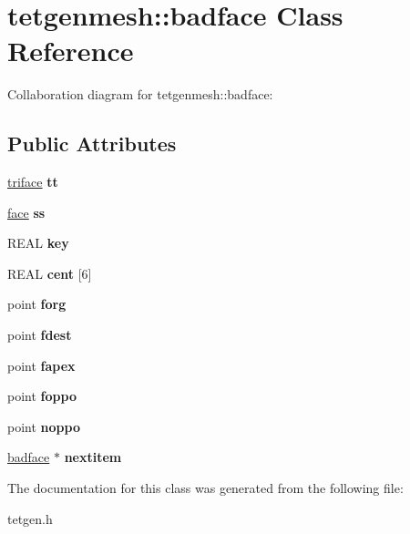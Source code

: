 \hypertarget{classtetgenmesh_1_1badface}{}\section{tetgenmesh\+:\+:badface Class Reference}
\label{classtetgenmesh_1_1badface}


Collaboration diagram for tetgenmesh\+:\+:badface\+:
\subsection*{Public Attributes}
\begin{DoxyCompactItemize}
\item 
\mbox{\label{classtetgenmesh_1_1badface_a01d24569e6058b3dae1a31e0638b849c}} 
\hyperlink{classtetgenmesh_1_1triface}{triface} {\bfseries tt}
\item 
\mbox{\label{classtetgenmesh_1_1badface_ace098878b5e89ec387c959d8acd0153d}} 
\hyperlink{classtetgenmesh_1_1face}{face} {\bfseries ss}
\item 
\mbox{\label{classtetgenmesh_1_1badface_ac94189eb4b728abd589597c89db9a1d7}} 
R\+E\+AL {\bfseries key}
\item 
\mbox{\label{classtetgenmesh_1_1badface_a72958cf685f881af15213f0925ccf72a}} 
R\+E\+AL {\bfseries cent} \mbox{[}6\mbox{]}
\item 
\mbox{\label{classtetgenmesh_1_1badface_a620b94f643bafaa7a4dbfeba7063a445}} 
point {\bfseries forg}
\item 
\mbox{\label{classtetgenmesh_1_1badface_a8e010478b28c997ad9b441d05df47695}} 
point {\bfseries fdest}
\item 
\mbox{\label{classtetgenmesh_1_1badface_a617348221ce387b323575110a5c79627}} 
point {\bfseries fapex}
\item 
\mbox{\label{classtetgenmesh_1_1badface_a8e9966e480c210ac83ab0a4c221a7000}} 
point {\bfseries foppo}
\item 
\mbox{\label{classtetgenmesh_1_1badface_ada4ec358fcf9261b2f14cff307e66fdf}} 
point {\bfseries noppo}
\item 
\mbox{\label{classtetgenmesh_1_1badface_ae87a801b03dbaa3dd5709ffed5eef5bc}} 
\hyperlink{classtetgenmesh_1_1badface}{badface} $\ast$ {\bfseries nextitem}
\end{DoxyCompactItemize}


The documentation for this class was generated from the following file\+:\begin{DoxyCompactItemize}
\item 
tetgen.\+h\end{DoxyCompactItemize}

